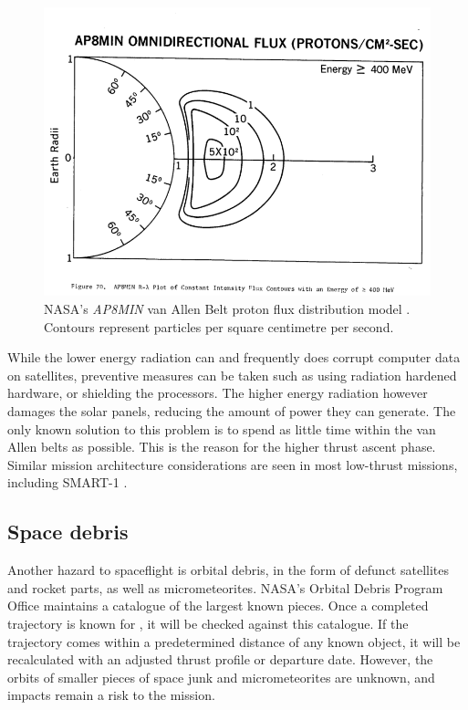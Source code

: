 \begin{figure} 
\includegraphics[width=\textwidth,clip,trim=0 35 0 67]{Images/800px-Ap8-omni-400_0MeV.png}
\caption{NASA's \emph{AP8MIN} van Allen Belt proton flux distribution model \parencite{Sawyer1976}. Contours represent particles per square centimetre per second.} \label{fig:vabs3}
\end{figure}

While the lower energy radiation can and frequently does corrupt computer data on satellites, preventive measures can be taken such as using radiation hardened hardware, or shielding the processors. The higher energy radiation however damages the solar panels, reducing the amount of power they can generate. The only known solution to this problem is to spend as little time within the van Allen belts as possible. This is the reason for the higher thrust ascent phase. Similar mission architecture considerations are seen in most low-thrust missions, including SMART-1 \parencite{Racca2002}.

\subsection{Space debris} \label{sub:Debris}

Another hazard to spaceflight is orbital debris, in the form of defunct satellites and rocket parts, as well as micrometeorites. NASA's Orbital Debris Program Office maintains a catalogue of the largest known pieces. Once a completed trajectory is known for \BW, it will be checked against this catalogue. If the trajectory comes within a predetermined distance of any known object, it will be recalculated with an adjusted thrust profile or departure date. However, the orbits of smaller pieces of space junk and micrometeorites are unknown, and impacts remain a risk to the mission.

